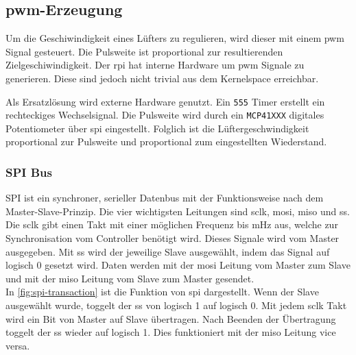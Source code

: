 \subsection{\Acrshort{pwm}-Erzeugung}

Um die Geschiwindigkeit eines Lüfters zu regulieren, wird dieser mit einem \gls{pwm} Signal gesteuert.
Die Pulsweite ist proportional zur resultierenden Zielgeschiwindigkeit.
Der \gls{rpi} hat interne Hardware um \gls{pwm} Signale zu generieren.
Diese sind jedoch nicht trivial aus dem Kernelspace erreichbar.

Als Ersatzlösung wird externe Hardware genutzt.
Ein \texttt{555} Timer erstellt ein rechteckiges Wechselsignal.
Die Pulsweite wird durch ein \texttt{MCP41XXX} digitales Potentiometer über \gls{spi} eingestellt.
Folglich ist die Lüftergeschwindigkeit proportional zur Pulsweite und proportional zum eingestellten Wiederstand.

\subsubsection{SPI Bus}

SPI ist ein synchroner, serieller Datenbus mit der Funktionsweise nach dem Master-Slave-Prinzip.
Die vier wichtigsten Leitungen sind \gls{sclk}, \gls{mosi}, \gls{miso} und \gls{ss}.
Die \gls{sclk} gibt einen Takt mit einer möglichen Frequenz bis $\si{\mHz}$ aus, welche zur Synchronisation vom Controller benötigt wird. Dieses Signale wird vom Master ausgegeben.
Mit \gls{ss} wird der jeweilige Slave ausgewählt, indem das Signal auf logisch 0 gesetzt wird.
Daten werden mit der \gls{mosi} Leitung vom Master zum Slave und mit der \gls{miso} Leitung vom Slave zum Master gesendet. \\
In \autoref{fig:spi-transaction} ist die Funktion von \gls{spi} dargestellt.
Wenn der Slave ausgewählt wurde, toggelt der \gls{ss} von logisch 1 auf logisch 0.
Mit jedem \gls{sclk} Takt wird ein Bit von Master auf Slave übertragen.
Nach Beenden der Übertragung toggelt der \gls{ss} wieder auf logisch 1.
Dies funktioniert mit der \gls{miso} Leitung vice versa.

